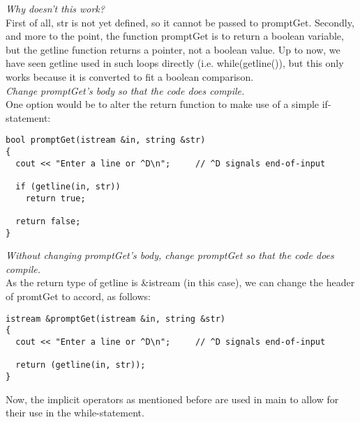 \textit{Why doesn't this work?} \\
First of all, str is not yet defined, so it cannot be passed to promptGet. Secondly, and more to the point, the function promptGet is to return a boolean variable, but the getline function returns a pointer, not a boolean value. Up to now, we have seen getline used in such loops directly (i.e. while(getline()), but this only works because it is converted to fit a boolean comparison. \\

\textit{Change promptGet's body so that the code does compile.} \\
One option would be to alter the return function to make use of a simple if-statement:

\begin{lstlisting}[style=in]
bool promptGet(istream &in, string &str)
{
  cout << "Enter a line or ^D\n";     // ^D signals end-of-input

  if (getline(in, str))
    return true;

  return false;
}
\end{lstlisting}

\textit{Without changing promptGet's body, change promptGet so that the code does compile.} \\
As the return type of getline is \&istream (in this case), we can change the header of promtGet to accord, as follows:

\begin{lstlisting}[style=in]
istream &promptGet(istream &in, string &str)
{
  cout << "Enter a line or ^D\n";     // ^D signals end-of-input

  return (getline(in, str));
}
\end{lstlisting}

Now, the implicit operators as mentioned before are used in main to allow for their use in the while-statement.
